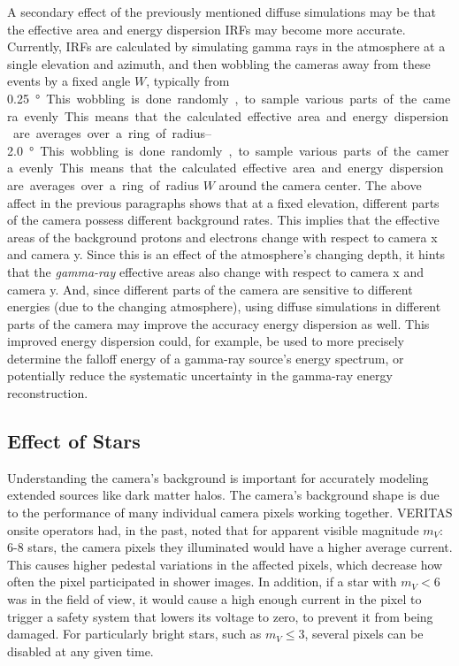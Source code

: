     A secondary effect of the previously mentioned diffuse simulations may be that the effective area and energy dispersion IRFs may become more accurate.
    Currently, IRFs are calculated by simulating gamma rays in the atmosphere at a single elevation and azimuth, and then wobbling the cameras away from these events by a fixed angle $W$, typically from \SIrange{0.25}{2.0}\degree.
    This wobbling is done randomly, to sample various parts of the camera evenly.
    This means that the calculated effective area and energy dispersion are averages over a ring of radius $W$ around the camera center.
    The above affect in the previous paragraphs shows that at a fixed elevation, different parts of the camera possess different background rates.
    This implies that the effective areas of the background protons and electrons change with respect to camera x and camera y.
    Since this is an effect of the atmosphere's changing depth, it hints that the \textit{gamma-ray} effective areas also change with respect to camera x and camera y.
    And, since different parts of the camera are sensitive to different energies (due to the changing atmosphere), using diffuse simulations in different parts of the camera may improve the accuracy energy dispersion as well.
    This improved energy dispersion could, for example, be used to more precisely determine the falloff energy of a gamma-ray source's energy spectrum, or potentially reduce the systematic uncertainty in the gamma-ray energy reconstruction.
  
  \FloatBarrier

  \subsection{Effect of Stars}
    Understanding the camera's background is important for accurately modeling extended sources like dark matter halos.
    The camera's background shape is due to the performance of many individual camera pixels working together.
    VERITAS onsite operators had, in the past, noted that for apparent visible magnitude $m_V :$ 6-8 stars, the camera pixels they illuminated would have a higher average current.
    This causes higher pedestal variations in the affected pixels, which decrease how often the pixel participated in shower images.
    In addition, if a star with $m_V < 6$ was in the field of view, it would cause a high enough current in the pixel to trigger a safety system that lowers its voltage to zero, to prevent it from being damaged.
    For particularly bright stars, such as $m_V \leq 3$, several pixels can be disabled at any given time.

